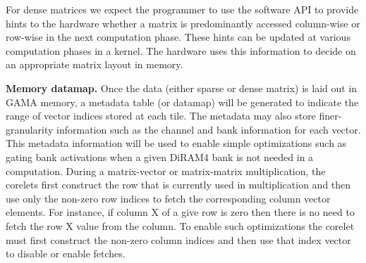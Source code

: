 For dense matrices we expect the programmer to use the software API to provide hints to the hardware whether a matrix is predominantly accessed column-wise or row-wise in the next computation phase. 
These hints can be updated at various computation phases in a kernel. 
The hardware uses this information to decide on an appropriate matrix layout in memory. 

\vspace{3pt}
\noindent
\textbf{Memory datamap.} 
Once the data (either sparse or dense matrix) is laid out in GAMA memory, a metadata table (or datamap) will be generated to indicate the range of vector indices stored at each tile.  
The metadata may also store finer-granularity information such as the channel and bank information for each vector. 
This metadata information will be used to enable simple optimizations such as gating bank activations when a given DiRAM4 bank is not needed in a computation.    
During a matrix-vector or matrix-matrix multiplication, the corelets first construct the row that is currently used in multiplication and then use only the non-zero row indices to fetch the corresponding column vector elements. 
For instance, if column X of a give row is zero then there is no need to fetch the row X value from the column. 
To enable such optimizations the corelet must first construct the non-zero column indices and then use that index vector to disable or enable fetches. 



